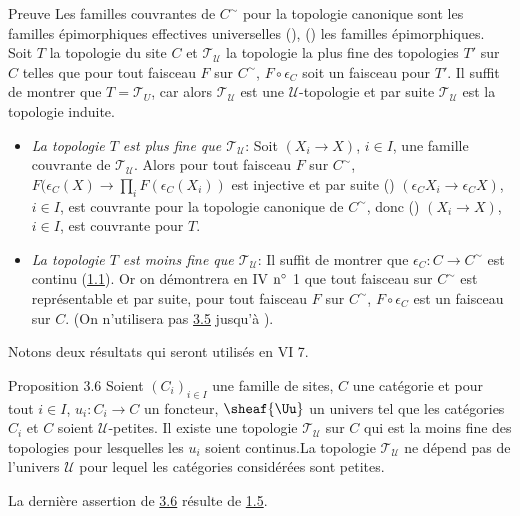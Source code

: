 \documentclass[10pt]{../fichiers-configuration-latex/smfart}
\begin{document}
\begin{enonce*}[remark]{Preuve}
Les familles couvrantes de $C^{\sim}$ pour la topologie canonique
sont les familles épimorphiques effectives universelles
(), \ie () les familles
épimorphiques. Soit $T$ la topologie du site $C$ et
$𝒯_{𝒰}$ la topologie la plus fine des topologies $T'$ sur
$C$ telles que pour tout faisceau $F$ sur $C^{\sim}$, $F\circ
\epsilon_C$ soit un faisceau pour $T'$. Il suffit de montrer que
$T=𝒯_U$, car alors $𝒯_{𝒰}$ est une $𝒰$-topologie
et par suite $𝒯_{𝒰}$ est la topologie induite.
\begin{itemize}
\item[A)] \emph{La topologie $T$ est plus fine que $𝒯_{𝒰}$}:
Soit $(X_i\rightarrow X)$, $i\in I$, une famille couvrante de
$𝒯_{𝒰}$. Alors pour tout faisceau $F$ sur $C^{\sim}$,
$F(\epsilon_C(X)\rightarrow\prod_i F(\epsilon_C(X_i))$ est injective
et par suite () $(\epsilon_C X_i\rightarrow
\epsilon_CX)$, $i\in I$, est couvrante pour la topologie canonique
de $C^{\sim}$, donc () $(X_i\rightarrow X)$, $i\in
I$, est couvrante pour $T$.

\item[B)] \emph{La topologie $T$ est moins fine que
$𝒯_{𝒰}$}: Il suffit de montrer que
$\epsilon_C:C\rightarrow C^{\sim}$ est continu (\hyperref[III.def1.1]{1.1}).
Or on démontrera en IV ${\rm n^{\circ}}$ 1 que tout faisceau sur
$C^{\sim}$ est représentable et par suite, pour tout faisceau
$F$ sur $C^{\sim}$, $F\circ \epsilon_C$ est un faisceau sur $C$. (On
n'utilisera pas \hyperref[III.prop3.5]{3.5} jusqu'à ).
\end{itemize}
Notons deux résultats qui seront utilisés en VI 7.
\end{enonce*}

\begin{enonce*}{Proposition 3.6}
Soient $(C_i)_{i\in I}$ une famille de sites, $C$ une catégorie
et pour tout $i\in I$, $u_i:C_i\rightarrow C$ un foncteur,
$\sheaf{\Uu}$ un univers tel que les catégories $C_i$ et $C$
soient $𝒰$-petites. Il existe une topologie
$𝒯_{𝒰}$ sur $C$ qui est la moins fine des topologies pour
lesquelles les $u_i$ soient continus.La topologie $𝒯_{𝒰}$
ne dépend pas de l'univers $𝒰$ pour lequel les
catégories considérées sont petites.
\end{enonce*}

La dernière assertion de \hyperref[III.prop3.6]{3.6} résulte de
\hyperref[III.prop1.5]{1.5}.
\end{document}
